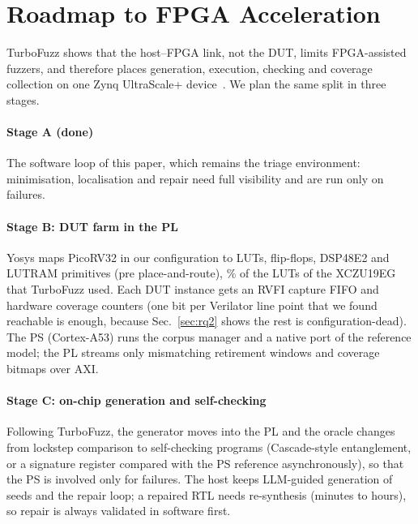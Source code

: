 \documentclass[conference,10pt]{IEEEtran}
\newcommand{\code}[1]{\texttt{\detokenize{#1}}}
\begin{document}
\section{Roadmap to FPGA Acceleration}\label{sec:fpga}
TurboFuzz shows that the host--FPGA link, not the DUT, limits FPGA-assisted fuzzers, and therefore places generation, execution,
checking and coverage collection on one Zynq UltraScale+ device~\cite{turbofuzz}. We plan the same split in three stages.

\paragraph*{Stage A (done)} The software loop of this paper, which remains the triage environment: minimisation, localisation and repair
need full visibility and are run only on failures.

\paragraph*{Stage B: DUT farm in the PL} Yosys \code{synth_xilinx -family xcup} maps PicoRV32 in our configuration to \SynLuts{} LUTs,
\SynFfs{} flip-flops, \SynDsp{} DSP48E2 and \SynLutram{} LUTRAM primitives (pre place-and-route), \SynLutPct\% of the LUTs of the
XCZU19EG that TurboFuzz used. Each DUT instance gets an RVFI capture FIFO and hardware coverage counters (one bit per Verilator line point
that we found reachable is enough, because Sec.~\ref{sec:rq2} shows the rest is configuration-dead). The PS (Cortex-A53) runs the corpus
manager and a native port of the reference model; the PL streams only mismatching retirement windows and coverage bitmaps over AXI.

\paragraph*{Stage C: on-chip generation and self-checking} Following TurboFuzz, the generator moves into the PL and the oracle changes from
lockstep comparison to self-checking programs (Cascade-style entanglement, or a signature register compared with the PS reference
asynchronously), so that the PS is involved only for failures. The host keeps LLM-guided generation of seeds and the repair loop; a repaired
RTL needs re-synthesis (minutes to hours), so repair is always validated in software first.
\end{document}
